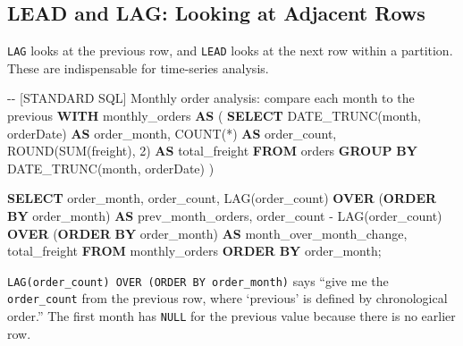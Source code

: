 \documentclass[
  letterpaper,
  DIV=11,
  numbers=noendperiod]{scrreprt}
\newenvironment{Shaded}{\begin{snugshade}}{\end{snugshade}}
\newcommand{\CommentTok}[1]{\textcolor[rgb]{0.37,0.37,0.37}{#1}}
\newcommand{\DecValTok}[1]{\textcolor[rgb]{0.68,0.00,0.00}{#1}}
\newcommand{\FunctionTok}[1]{\textcolor[rgb]{0.28,0.35,0.67}{#1}}
\newcommand{\KeywordTok}[1]{\textcolor[rgb]{0.00,0.23,0.31}{\textbf{#1}}}
\newcommand{\NormalTok}[1]{\textcolor[rgb]{0.00,0.23,0.31}{#1}}
\newcommand{\OperatorTok}[1]{\textcolor[rgb]{0.37,0.37,0.37}{#1}}
\newcommand{\StringTok}[1]{\textcolor[rgb]{0.13,0.47,0.30}{#1}}
\begin{document}
\subsection{LEAD and LAG: Looking at Adjacent
Rows}\label{lead-and-lag-looking-at-adjacent-rows}

\texttt{LAG} looks at the previous row, and \texttt{LEAD} looks at the
next row within a partition. These are indispensable for time-series
analysis.

\begin{codelisting}

\caption{\texttt{duckdb}}

\begin{Shaded}
\begin{Highlighting}[]
\CommentTok{{-}{-} [STANDARD SQL] Monthly order analysis: compare each month to the previous}
\KeywordTok{WITH}\NormalTok{ monthly\_orders }\KeywordTok{AS}\NormalTok{ (}
    \KeywordTok{SELECT}
\NormalTok{        DATE\_TRUNC(}\StringTok{\textquotesingle{}month\textquotesingle{}}\NormalTok{, orderDate) }\KeywordTok{AS}\NormalTok{ order\_month,}
        \FunctionTok{COUNT}\NormalTok{(}\OperatorTok{*}\NormalTok{) }\KeywordTok{AS}\NormalTok{ order\_count,}
        \FunctionTok{ROUND}\NormalTok{(}\FunctionTok{SUM}\NormalTok{(freight), }\DecValTok{2}\NormalTok{) }\KeywordTok{AS}\NormalTok{ total\_freight}
    \KeywordTok{FROM}\NormalTok{ orders}
    \KeywordTok{GROUP} \KeywordTok{BY}\NormalTok{ DATE\_TRUNC(}\StringTok{\textquotesingle{}month\textquotesingle{}}\NormalTok{, orderDate)}
\NormalTok{)}

\KeywordTok{SELECT}
\NormalTok{    order\_month,}
\NormalTok{    order\_count,}
    \FunctionTok{LAG}\NormalTok{(order\_count) }\KeywordTok{OVER}\NormalTok{ (}\KeywordTok{ORDER} \KeywordTok{BY}\NormalTok{ order\_month) }\KeywordTok{AS}\NormalTok{ prev\_month\_orders,}
\NormalTok{    order\_count }\OperatorTok{{-}} \FunctionTok{LAG}\NormalTok{(order\_count) }\KeywordTok{OVER}\NormalTok{ (}\KeywordTok{ORDER} \KeywordTok{BY}\NormalTok{ order\_month) }\KeywordTok{AS}\NormalTok{ month\_over\_month\_change,}
\NormalTok{    total\_freight}
\KeywordTok{FROM}\NormalTok{ monthly\_orders}
\KeywordTok{ORDER} \KeywordTok{BY}\NormalTok{ order\_month;}
\end{Highlighting}
\end{Shaded}

\end{codelisting}

\texttt{LAG(order\_count)\ OVER\ (ORDER\ BY\ order\_month)} says ``give
me the \texttt{order\_count} from the previous row, where `previous' is
defined by chronological order.'' The first month has \texttt{NULL} for
the previous value because there is no earlier row.
\end{document}
